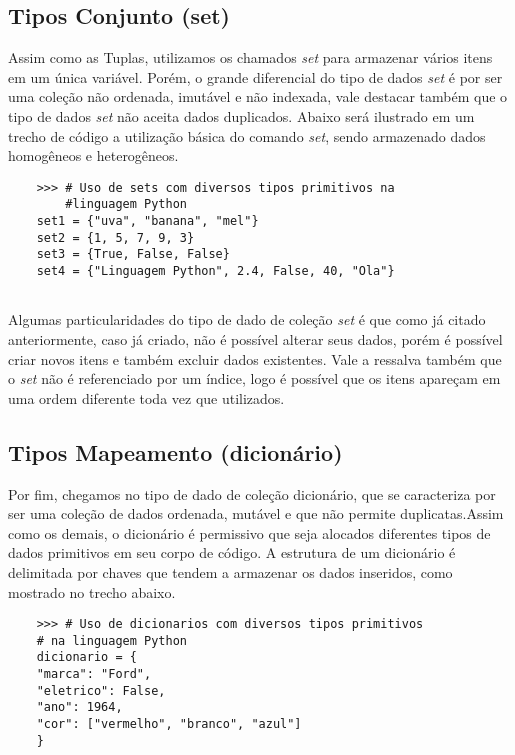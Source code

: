             \subsection{Tipos Conjunto (set)}

Assim como as Tuplas, utilizamos os chamados \textit{set} para armazenar vários itens em um única variável. Porém, o grande diferencial do tipo de dados \textit{set} é por ser uma coleção não ordenada, imutável e não indexada, vale destacar também que o tipo de dados \textit{set} não aceita dados duplicados. Abaixo será ilustrado em um trecho de código a utilização básica do comando \textit{set}, sendo armazenado dados homogêneos e heterogêneos.
    
  \begin{lstlisting}
  	>>> # Uso de sets com diversos tipos primitivos na
        #linguagem Python
  	set1 = {"uva", "banana", "mel"}
  	set2 = {1, 5, 7, 9, 3}
  	set3 = {True, False, False}
  	set4 = {"Linguagem Python", 2.4, False, 40, "Ola"}
  	
  \end{lstlisting} 

Algumas particularidades do tipo de dado de coleção \textit{set} é que como já citado anteriormente, caso já criado, não é possível alterar seus dados, porém é possível criar novos itens e também excluir dados existentes. Vale a ressalva também que o \textit{set} não é referenciado por um índice, logo é possível que os itens apareçam em uma ordem diferente toda vez que utilizados. 
            \subsection{Tipos Mapeamento (dicionário)}
Por fim, chegamos no tipo de dado de coleção dicionário, que se caracteriza por ser uma coleção de dados ordenada, mutável e que não permite duplicatas.Assim como os demais, o dicionário é permissivo que seja alocados diferentes tipos de dados primitivos em seu corpo de código. A estrutura de um dicionário é delimitada por chaves que tendem a armazenar os dados inseridos, como mostrado no trecho abaixo.
 \begin{lstlisting}
	>>> # Uso de dicionarios com diversos tipos primitivos 
	# na linguagem Python
	dicionario = {
	"marca": "Ford",
	"eletrico": False,
	"ano": 1964,
	"cor": ["vermelho", "branco", "azul"]
	}
	
\end{lstlisting} 



